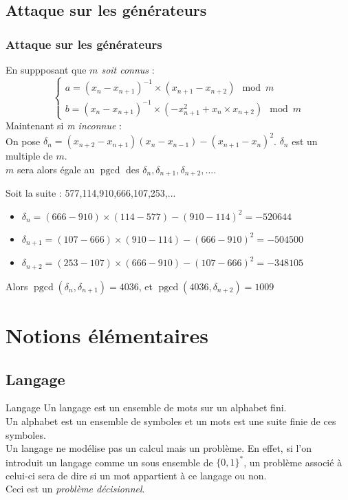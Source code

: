 \documentclass[utf8,10pt,french]{beamer}
\newcommand{\var}[1]{\textit{\color{green!50!black}#1}}
\DeclareMathOperator{\pgcd}{pgcd}
\begin{document}
\subsection{Attaque sur les générateurs}
\begin{frame}
  \frametitle{Attaque sur les générateurs}
 En suppposant que \textit{$m$ soit connus} :
$$\begin{cases}
a=(x_{n}-x_{n+1})^{-1}\times(x_{n+1}-x_{n+2}) \mod{m}  \\
b=(x_{n}-x_{n+1})^{-1}\times(-x_{n+1}^2 + x_{n} \times x_{n+2}) \mod{m}
\end{cases}$$ \pause
Maintenant si \textit{m inconnue} : \\
On pose $\delta_{n}=(x_{n+2}-x_{n+1})(x_{n}-x_{n-1})-(x_{n+1}-x_{n})^2$.
$\delta_n$ est un multiple de $m$.\\ $m$ sera alors égale au $\pgcd$ des $\delta_{n},\delta_{n+1},\delta_{n+2},...$.\pause

\begin{example}
Soit la suite : 577,114,910,666,107,253,...
\begin{itemize}
\item $\delta_{n} = (666-910) \times (114-577) - (910-114)^2 = -520644$
\item $\delta_{n+1} = (107-666) \times (910-114) - (666-910)^2 = -504500$
\item $\delta_{n+2} = (253-107) \times (666-910) - (107-666)^2 = -348105$
\end{itemize}
Alors $\pgcd(\delta_n,\delta_{n+1})=4036$, et $\pgcd(4036,\delta_{n+2})=1009$
\end{example}
\end{frame}

\section{Notions élémentaires}
\subsection{Langage}
\begin{frame}{Langage}
Un langage est un ensemble de mots sur un alphabet fini.\\
Un alphabet est un ensemble de symboles et un mots est une suite finie de ces symboles.\\
Un langage ne modélise pas un calcul mais un problème. En effet, si l'on introduit un langage comme un sous ensemble de $\{0,1\}^*$, un problème associé à celui-ci sera de dire si un mot appartient à ce langage ou non.\\
Ceci est un \var{problème décisionnel}.
\end{frame}
\end{document}
